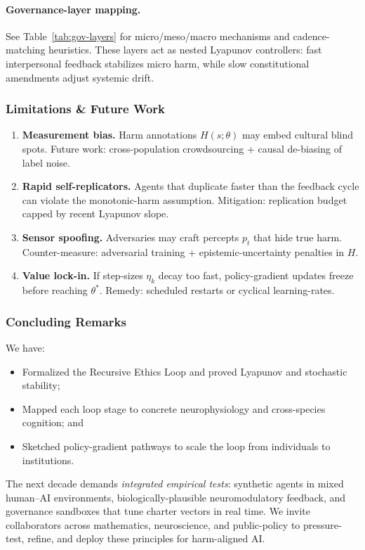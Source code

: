 \paragraph{Governance-layer mapping.}
See Table~\ref{tab:gov-layers} for micro/meso/macro mechanisms
and cadence-matching heuristics.
These layers act as nested Lyapunov controllers:
fast interpersonal feedback stabilizes micro harm,
while slow constitutional amendments adjust systemic drift.


\subsubsection{Limitations \& Future Work}
\label{sec:limitations}

\begin{enumerate}
\item \textbf{Measurement bias.}
      Harm annotations $H(s;\theta)$ may embed cultural blind spots.
      Future work: cross-population crowdsourcing + causal
      de-biasing of label noise.
\item \textbf{Rapid self-replicators.}
      Agents that duplicate faster than the feedback cycle
      can violate the monotonic-harm assumption.
      Mitigation: replication budget capped by recent Lyapunov slope.
\item \textbf{Sensor spoofing.}
      Adversaries may craft percepts $p_t$ that hide true harm.
      Counter-measure: adversarial training +
      epistemic-uncertainty penalties in $H$.
\item \textbf{Value lock-in.}
      If step-sizes $\eta_k$ decay too fast, policy-gradient updates
      freeze before reaching $\theta^\ast$.
      Remedy: scheduled restarts or cyclical learning-rates.
\end{enumerate}


\subsubsection{Concluding Remarks}
\label{sec:conclusion}

We have:
\begin{itemize}
\item Formalized the Recursive Ethics Loop
      and proved Lyapunov and stochastic stability;
\item Mapped each loop stage to concrete neurophysiology
      and cross-species cognition; and
\item Sketched policy-gradient pathways to scale the loop
      from individuals to institutions.
\end{itemize}
%
The next decade demands \emph{integrated empirical tests}:  
synthetic agents in mixed human–AI environments,  
biologically-plausible neuromodulatory feedback,  
and governance sandboxes that tune charter vectors in real time.
We invite collaborators across mathematics, neuroscience,
and public-policy to pressure-test, refine,
and deploy these principles for harm-aligned AI.


